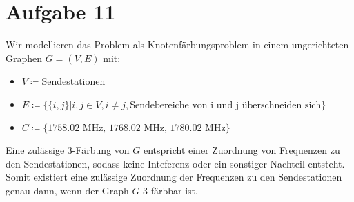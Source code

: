\documentclass[12pt, a4paper]{article}
\begin{document}
\begin{enumerate}[label=\alph*)]
\begin{center}
\end{center}
\end{enumerate}



\newpage



\section*{Aufgabe 11}
Wir modellieren das Problem als Knotenfärbungsproblem in einem ungerichteten Graphen $G=(V,E)$ mit:
\begin{itemize}
	\item $V \coloneqq $Sendestationen
	\item $E \coloneqq \{\{i,j\} \vert i,j \in V, i \neq j, \text{Sendebereiche von i und j überschneiden sich}\}$
	\item $C \coloneqq \{\text{1758.02 MHz, 1768.02 MHz, 1780.02 MHz}\}$
\end{itemize}
Eine zulässige $3$-Färbung von $G$ entspricht einer Zuordnung von Frequenzen zu den Sendestationen, sodass keine Inteferenz oder ein sonstiger Nachteil entsteht.\\
Somit existiert eine zulässige Zuordnung der Frequenzen zu den Sendestationen genau dann, wenn der Graph $G$ $3$-färbbar ist.\\
\end{document}
